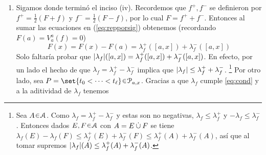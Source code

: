 \begin{sol}
\begin{enumerate}[label=(\roman*),leftmargin=1.8em]
Para la necesidad supongamos $f\en BV(I)$. Entonces (ii) garantiza que existen funciones monótonas y continuas por la derecha $f^+,f^-$ con $f= f^+ - f^-$, así que lo probado anteriormente implica que existen medidas de Borel $\lambda^+_f,\lambda^-_f \colon \mathcal{B} \to [0,\infty)$ que cumplen, para $x\en[a,b]$:
\begin{equation}\label{eq:repporsig}
f^+(x) - f^+(a) = \lambda^+_f([a,x])
\qquad\text{y}\qquad
f^-(x) - f^-(a) = \lambda^-_f([a,x])
\end{equation}
pero $\lambda_f \coloneq \lambda^+_f-\lambda^-_f$ es una medida con signo (por tanto de Borel, ya que es finita). Finalmente, restando las dos ecuaciones en (\ref{eq:repporsig}) se concluye 
\[
f(x) - f(a) = \lambda_f([a,x]),
\qquad\forall x\en[a,b]
\]
En particular, para $x=a$ se tiene $\lambda_f(\set{a}) = \lambda_f([a,a]) = f(a) - f(a) = 0$.
\item %
Sigamos donde terminó el inciso (iv). Recordemos que $f^+,f^-$ se definieron por $f^+ = \frac12(F+f)$ y $f^- = \frac12(F-f)$, por lo cual $F = f^+ + f^-$. Entonces al sumar las ecuaciones en (\ref{eq:repporsig}) obtenemos (recordando $F(a) = V^a_a(f) = 0$)
\begin{equation}\label{eq:varf}
F(x)=F(x) - F(a) = \lambda^+_f([a,x])+ \lambda^-_f([a,x])
\end{equation}
Solo faltaría probar que $\abs{\lambda_f}([a,x]) = \lambda^+_f([a,x]) + \lambda^-_f([a,x])$. En efecto, por un lado el hecho de que $\lambda_f = \lambda^+_f - \lambda^-_f$ implica que $\abs{\lambda_f} \leq \lambda^+_f + \lambda^-_f$.%
\footnote{
    Sea $A\en\mathcal{A}$. Como $\lambda_f = \lambda^+_f- \lambda^-_f$ y estas son no negativas, $\lambda_f \le \lambda^+_f$ y $-\lambda_f \le \lambda^-_f$. Entonces dados $E,F\en\mathcal{A}$ con $A = E \mathbin{\dot{\cup}} F$ se tiene $\lambda_f(E) - \lambda_f(F) \leq \lambda^+_f(E) + \lambda^-_f(F) \le \lambda^+_f(A) + \lambda^-_f(A)$, así que al tomar supremos $\abs{\lambda_f}(A) \le \lambda^+_f(A) + \lambda^-_f(A)$.
}
Por otro lado, sea $P = \set{t_0<\cdots<t_\ell}\en\mathcal{P}_{a,x}$. Gracias a que $\lambda_f$ cumple \eqref{eq:cond} y a la aditividad de $\lambda_f$ tenemos

\end{enumerate}
\end{sol}
